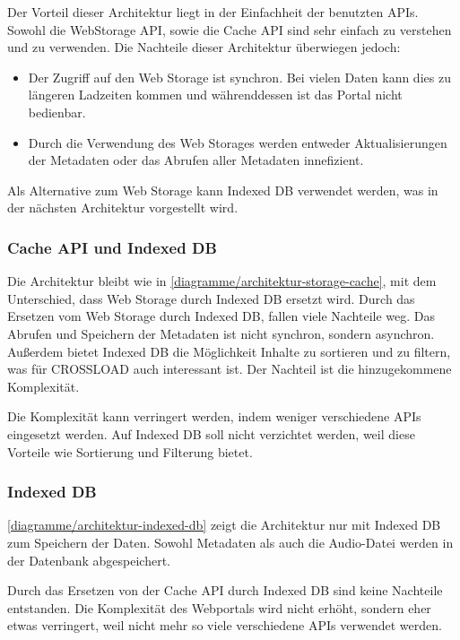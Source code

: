Der Vorteil dieser Architektur liegt in der Einfachheit der benutzten \acp{API}. Sowohl die WebStorage \ac{API}, sowie die Cache \ac{API} sind sehr einfach zu verstehen und zu verwenden. Die Nachteile dieser Architektur überwiegen jedoch:

\begin{itemize}
\item Der Zugriff auf den Web Storage ist synchron. Bei vielen Daten kann dies zu längeren Ladzeiten kommen und währenddessen ist das Portal nicht bedienbar. 
\item Durch die Verwendung des Web Storages werden entweder Aktualisierungen der Metadaten oder das Abrufen aller Metadaten innefizient. 
\end{itemize}

Als Alternative zum Web Storage kann Indexed DB verwendet werden, was in der nächsten Architektur vorgestellt wird.

\subsubsection{Cache API und Indexed DB}
Die Architektur bleibt wie in \autoref{diagramme/architektur-storage-cache}, mit dem Unterschied, dass Web Storage durch Indexed DB ersetzt wird. Durch das Ersetzen vom Web Storage durch Indexed DB, fallen viele Nachteile weg. Das Abrufen und Speichern der Metadaten ist nicht synchron, sondern asynchron. Außerdem bietet Indexed DB die Möglichkeit Inhalte zu sortieren und zu filtern, was für CROSSLOAD auch interessant ist. Der Nachteil ist die hinzugekommene Komplexität. 

Die Komplexität kann verringert werden, indem weniger verschiedene \acp{API} eingesetzt werden. Auf Indexed DB soll nicht verzichtet werden, weil diese Vorteile wie Sortierung und Filterung bietet. 

\subsubsection{Indexed DB}
\autoref{diagramme/architektur-indexed-db} zeigt die Architektur nur mit Indexed DB zum Speichern der Daten. Sowohl Metadaten als auch die Audio-Datei werden in der Datenbank abgespeichert. 


Durch das Ersetzen von der Cache \ac{API} durch Indexed DB sind keine Nachteile entstanden. Die Komplexität des Webportals wird nicht erhöht, sondern eher etwas verringert, weil nicht mehr so viele verschiedene \acp{API} verwendet werden.

